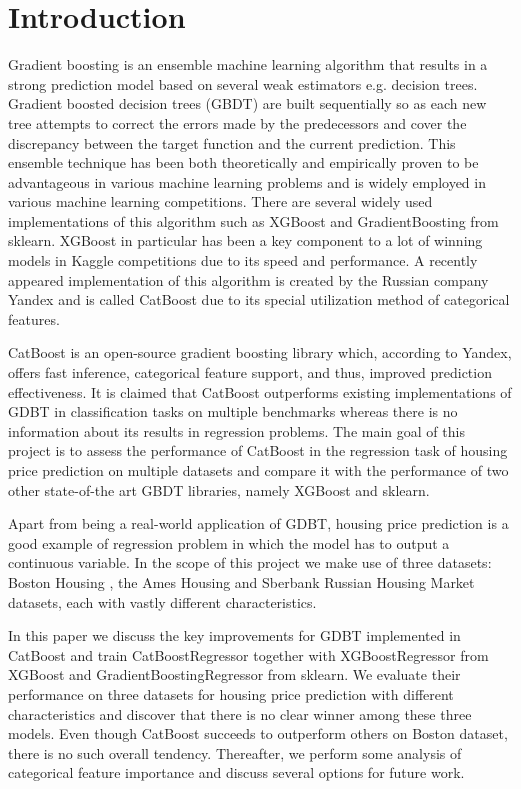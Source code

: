 \section{Introduction}
\label{sec:introduction}

Gradient boosting is an ensemble machine learning algorithm that results in a strong prediction model based on several weak estimators e.g. decision trees. Gradient boosted decision trees (GBDT) are built sequentially so as each new tree attempts to correct the errors made by the predecessors and cover the discrepancy between the target function and the current prediction. This ensemble technique has been both theoretically and empirically proven to be advantageous in various machine learning problems and is widely employed in various machine learning competitions. There are several widely used implementations of this algorithm such as XGBoost and GradientBoosting from sklearn. XGBoost in particular has been a key component to a lot of winning models in Kaggle competitions due to its speed and performance. A recently appeared implementation of this algorithm is created by the Russian company Yandex and is called CatBoost due to its special utilization method of categorical features.

CatBoost is an open-source gradient boosting library which, according to Yandex, offers fast inference, categorical feature support, and thus, improved prediction effectiveness. It is claimed that CatBoost outperforms existing implementations of GDBT in classification tasks on multiple benchmarks \cite{catboost2017yandex} whereas there is no information about its results in regression problems. The main goal of this project is to assess the performance of CatBoost in the regression task of housing price prediction on multiple datasets and compare it with the performance of two other state-of-the art GBDT libraries, namely XGBoost and sklearn.

Apart from being a real-world application of GDBT, housing price prediction is a good example of regression problem in which the model has to output a continuous variable. In the scope of this project we make use of three datasets: Boston Housing \cite{boston1978housing}, the Ames Housing \cite{de2011ames} and Sberbank Russian Housing Market \cite{sberbank2017housing} datasets, each with vastly different characteristics.

In this paper we discuss the key improvements for GDBT implemented in CatBoost and train CatBoostRegressor together with XGBoostRegressor from XGBoost and GradientBoostingRegressor from sklearn. We evaluate their performance on three datasets for housing price prediction with different characteristics and discover that there is no clear winner among these three models. Even though CatBoost succeeds to outperform others on Boston dataset, there is no such overall tendency. Thereafter, we perform some analysis of categorical feature importance and discuss several options for future work.

